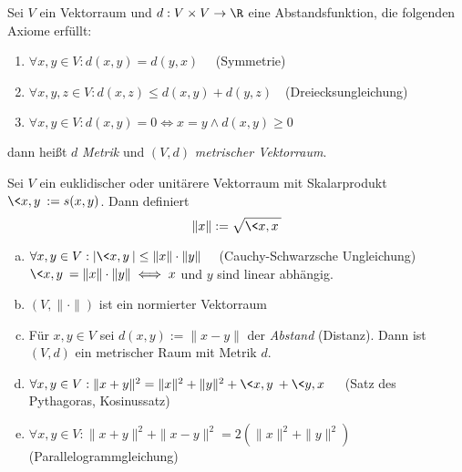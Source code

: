 \documentclass[a4paper, 10pt]{scrbook}
\begin{document}
\begin{df*}
	Sei $V$ ein Vektorraum und $d: V\times V \to \R$ eine Abstandsfunktion, die folgenden Axiome erfüllt:
	\begin{enumerate}[({M}1)]
		\item $\forall x,y\in V: d(x,y) = d(y,x)\quad $ (Symmetrie)
		\item $\forall x,y,z\in V: d(x,z) \le d(x,y) + d(y,z)\quad $(Dreiecksungleichung)
		\item $\forall x,y \in V: d(x,y) = 0 \iff x=y \land d(x,y) \ge 0$
	\end{enumerate}
	dann heißt $d$ \emph{Metrik} und $(V,d)$ \emph{metrischer Vektorraum}.
\end{df*}


\begin{thm}
	\label{thm:13.6}
	Sei $V$ ein euklidischer oder unitärere Vektorraum mit Skalarprodukt $\<x,y\> := s(x,y)$.
	Dann definiert
	\[
		\|x\| := \sqrt{\<x,x\>}
	\]
	\begin{enumerate}[(a)]
		\item
			$\forall x,y \in V: |\<x,y\>| \le \|x\|\cdot \|y\|\quad$ (Cauchy-Schwarzsche Ungleichung)\\
			$\<x,y\> = \|x\|\cdot \|y\| \iff x $ und $ y$ sind linear abhängig. 
		\item
			$(V,\|\cdot\|)$ ist ein normierter Vektorraum
		\item
			Für $x,y\in V$ sei $d(x,y) := \|x-y\|$ der \emph{Abstand} (Distanz).
			Dann ist $(V,d)$ ein metrischer Raum mit Metrik $d$.
		\item
			$\forall x,y \in V: \|x+y\|^2 = \|x\|^2 +\|y\|^2 + \<x,y\> + \<y,x\>\quad $ (Satz des Pythagoras, Kosinussatz)
		\item
			$\forall x,y \in V: \|x+y\|^2 + \|x-y\|^2 = 2(\|x\|^2 + \|y\|^2)\quad $ (Parallelogrammgleichung)
	\end{enumerate}


\end{thm}
\end{document}
